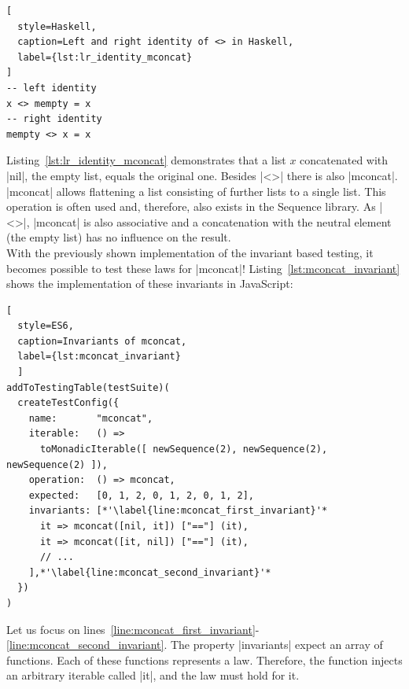 \begin{lstlisting}[
  style=Haskell,
  caption=Left and right identity of <> in Haskell,
  label={lst:lr_identity_mconcat}
]
-- left identity
x <> mempty = x
-- right identity
mempty <> x = x
\end{lstlisting}

Listing~\ref{lst:lr_identity_mconcat} demonstrates that a list $x$ concatenated
with |nil|, the empty list, equals the original one. 
Besides |<>| there is also |mconcat|. |mconcat| allows flattening a list consisting
of further lists to a single list. This operation is often used and, therefore,
also exists in the Sequence library. As |<>|, |mconcat| is also
associative and a concatenation with the neutral element (the empty list)
has no influence on the result.\\ 
With the previously shown implementation of the invariant based testing, it
becomes possible to test these laws for |mconcat|!
Listing~\ref{lst:mconcat_invariant} shows the implementation of these
invariants in JavaScript:

\begin{lstlisting}[
  style=ES6, 
  caption=Invariants of mconcat,
  label={lst:mconcat_invariant}
  ]
addToTestingTable(testSuite)(
  createTestConfig({
    name:       "mconcat",
    iterable:   () => 
      toMonadicIterable([ newSequence(2), newSequence(2), newSequence(2) ]),
    operation:  () => mconcat,
    expected:   [0, 1, 2, 0, 1, 2, 0, 1, 2],
    invariants: [*'\label{line:mconcat_first_invariant}'*
      it => mconcat([nil, it]) ["=="] (it),
      it => mconcat([it, nil]) ["=="] (it),
      // ...
    ],*'\label{line:mconcat_second_invariant}'*
  })
)
\end{lstlisting}

Let us focus on lines~\ref{line:mconcat_first_invariant}-\ref{line:mconcat_second_invariant}.
The property |invariants| expect an array of functions. Each of these
functions represents a law. Therefore, the function injects an arbitrary
iterable called |it|, and the law must hold for it.

